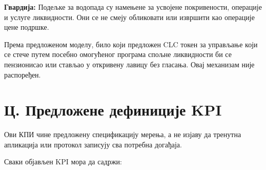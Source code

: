 \documentclass[11pt]{article}
\begin{document}
\textbf{Гвардија:} Подељке за водопада су намењене за усвојене покривености, операције и услуге ликвидности. Они се не смеју обликовати или извршити као операције цене подршке.

Према предложеном моделу, било који предложен CLC токен за управљање који се стече путем посебно омогућеног програма спољне ликвидности би се пензионисао или стављао у откривену лавицу без гласања. Овај механизам није распоређен.


\section*{Ц. Предложене дефиниције KPI}

Ови КПИ чине предложену спецификацију мерења, а не изјаву да тренутна апликација или протокол записују сва потребна догађаја.

Сваки објављен KPI мора да садржи:
\end{document}
